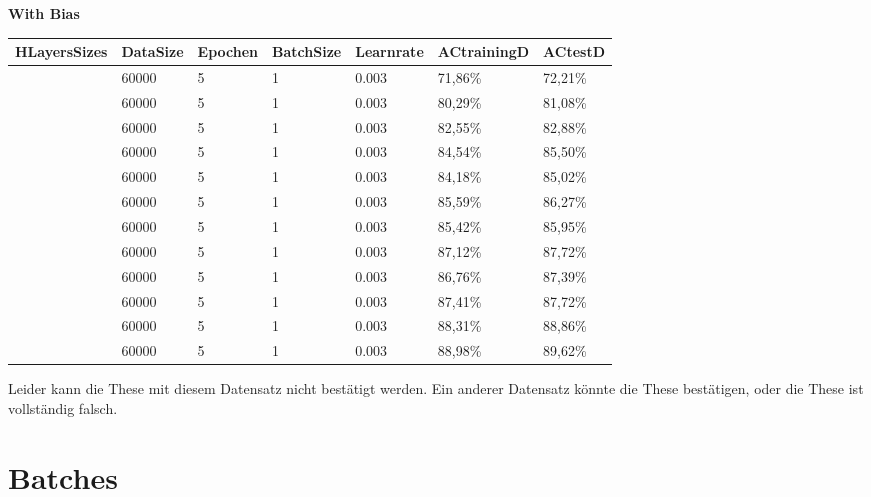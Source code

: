 \documentclass[12pt]{article}
\begin{document}
\begin{table}[H]
    \centering
    \textbf{With Bias}
    \begin{tabular}{|l|l|l|l|l|l|l|}
    \hline
        HLayersSizes & DataSize & Epochen & BatchSize & Learnrate & ACtrainingD & ACtestD \\ \hline
        [784, 10, 10] & 60000 & 5 & 1 & 0.003 & 71,86\% & 72,21\% \\ \hline
        [784, 20, 10] & 60000 & 5 & 1 & 0.003 & 80,29\% & 81,08\% \\ \hline
        [784, 30, 10] & 60000 & 5 & 1 & 0.003 & 82,55\% & 82,88\% \\ \hline
        [784, 40, 10] & 60000 & 5 & 1 & 0.003 & 84,54\% & 85,50\% \\ \hline
        [784, 50, 10] & 60000 & 5 & 1 & 0.003 & 84,18\% & 85,02\% \\ \hline
        [784, 60, 10] & 60000 & 5 & 1 & 0.003 & 85,59\% & 86,27\% \\ \hline
        [784, 70, 10] & 60000 & 5 & 1 & 0.003 & 85,42\% & 85,95\% \\ \hline
        [784, 80, 10] & 60000 & 5 & 1 & 0.003 & 87,12\% & 87,72\% \\ \hline
        [784, 90, 10] & 60000 & 5 & 1 & 0.003 & 86,76\% & 87,39\% \\ \hline
        [784, 100, 10] & 60000 & 5 & 1 & 0.003 & 87,41\% & 87,72\% \\ \hline
        [784, 150, 10] & 60000 & 5 & 1 & 0.003 & 88,31\% & 88,86\% \\ \hline
        [784, 200, 10] & 60000 & 5 & 1 & 0.003 & 88,98\% & 89,62\% \\ \hline
    \end{tabular}
\end{table}
Leider kann die These mit diesem Datensatz nicht bestätigt werden. Ein anderer Datensatz könnte die These bestätigen, oder die These ist vollständig falsch.
\section{Batches}
\end{document}
